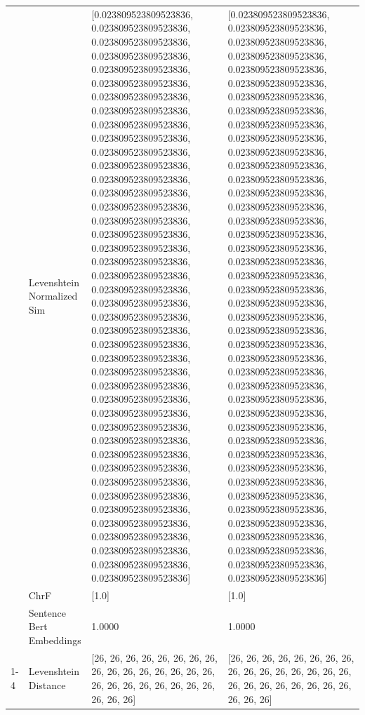 \begin{tabular}{llll}
 & Levenshtein Normalized Sim & [0.023809523809523836, 0.023809523809523836, 0.023809523809523836, 0.023809523809523836, 0.023809523809523836, 0.023809523809523836, 0.023809523809523836, 0.023809523809523836, 0.023809523809523836, 0.023809523809523836, 0.023809523809523836, 0.023809523809523836, 0.023809523809523836, 0.023809523809523836, 0.023809523809523836, 0.023809523809523836, 0.023809523809523836, 0.023809523809523836, 0.023809523809523836, 0.023809523809523836, 0.023809523809523836, 0.023809523809523836, 0.023809523809523836, 0.023809523809523836, 0.023809523809523836, 0.023809523809523836, 0.023809523809523836, 0.023809523809523836, 0.023809523809523836, 0.023809523809523836, 0.023809523809523836, 0.023809523809523836, 0.023809523809523836, 0.023809523809523836, 0.023809523809523836, 0.023809523809523836, 0.023809523809523836, 0.023809523809523836, 0.023809523809523836, 0.023809523809523836, 0.023809523809523836, 0.023809523809523836] & [0.023809523809523836, 0.023809523809523836, 0.023809523809523836, 0.023809523809523836, 0.023809523809523836, 0.023809523809523836, 0.023809523809523836, 0.023809523809523836, 0.023809523809523836, 0.023809523809523836, 0.023809523809523836, 0.023809523809523836, 0.023809523809523836, 0.023809523809523836, 0.023809523809523836, 0.023809523809523836, 0.023809523809523836, 0.023809523809523836, 0.023809523809523836, 0.023809523809523836, 0.023809523809523836, 0.023809523809523836, 0.023809523809523836, 0.023809523809523836, 0.023809523809523836, 0.023809523809523836, 0.023809523809523836, 0.023809523809523836, 0.023809523809523836, 0.023809523809523836, 0.023809523809523836, 0.023809523809523836, 0.023809523809523836, 0.023809523809523836, 0.023809523809523836, 0.023809523809523836, 0.023809523809523836, 0.023809523809523836, 0.023809523809523836, 0.023809523809523836, 0.023809523809523836, 0.023809523809523836] \\
 & ChrF & [1.0] & [1.0] \\
 & Sentence Bert Embeddings & 1.0000 & 1.0000 \\
\cline{1-4}
\multirow[t]{4}{*}{Obotaka nigo bore engencho kera ogose.} & Levenshtein Distance & [26, 26, 26, 26, 26, 26, 26, 26, 26, 26, 26, 26, 26, 26, 26, 26, 26, 26, 26, 26, 26, 26, 26, 26, 26, 26, 26] & [26, 26, 26, 26, 26, 26, 26, 26, 26, 26, 26, 26, 26, 26, 26, 26, 26, 26, 26, 26, 26, 26, 26, 26, 26, 26, 26] \\

\end{tabular}
